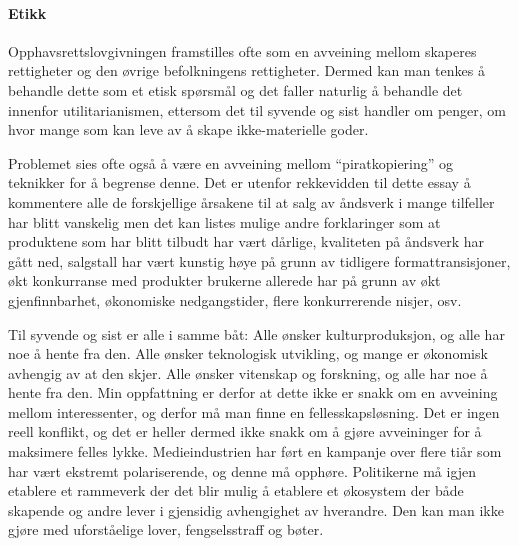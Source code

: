 \documentclass[11pt,norsk,a4paper]{article}
\begin{document}
\paragraph{Etikk}

Opphavsrettslovgivningen framstilles ofte som en avveining mellom
skaperes rettigheter og den øvrige befolkningens rettigheter. Dermed
kan man tenkes å behandle dette som et etisk spørsmål og det faller
naturlig å behandle det innenfor utilitarianismen, ettersom det til
syvende og sist handler om penger, om hvor mange som kan leve av å
skape ikke-materielle goder.

Problemet sies ofte også å være en avveining mellom ``piratkopiering''
og teknikker for å begrense denne. Det er utenfor rekkevidden til
dette essay å kommentere alle de forskjellige årsakene til at
salg av åndsverk i mange tilfeller har blitt vanskelig men det
kan listes mulige andre forklaringer som at produktene som har blitt
tilbudt har vært dårlige, kvaliteten på åndsverk har gått ned,
salgstall har vært kunstig høye på grunn av tidligere
formattransisjoner, økt konkurranse med produkter brukerne allerede
har på grunn av økt gjenfinnbarhet, økonomiske nedgangstider, flere
konkurrerende nisjer, osv. 

Til syvende og sist er alle i samme båt: Alle ønsker kulturproduksjon,
og alle har noe å hente fra den. Alle ønsker teknologisk utvikling, og
mange er økonomisk avhengig av at den skjer. Alle ønsker vitenskap og
forskning, og alle har noe å hente fra den. 
Min oppfattning er derfor at dette ikke er snakk om en avveining
mellom interessenter, og derfor må man finne en
fellesskapsløsning. Det er ingen reell konflikt, og det er heller
dermed ikke snakk om å gjøre avveininger for å maksimere felles
lykke. Medieindustrien har ført en kampanje over flere
tiår som har vært ekstremt polariserende, og denne må
opphøre. Politikerne må igjen etablere et rammeverk der det blir mulig
å etablere et økosystem der både skapende og andre lever i gjensidig
avhengighet av hverandre. Den kan man ikke gjøre med uforståelige
lover, fengselsstraff og bøter. 

{}

\end{document}
